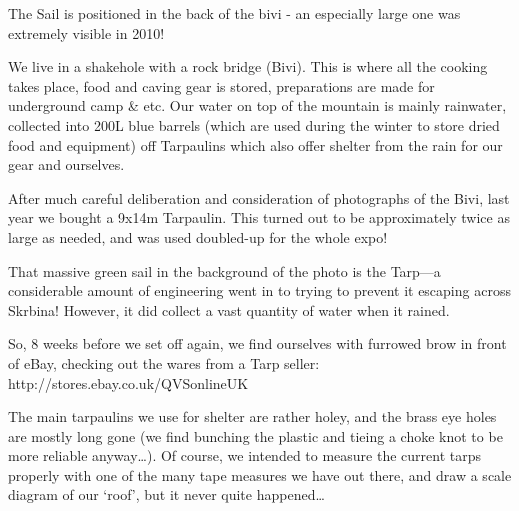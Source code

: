 \begin{pagefigure}
      \checkoddpage \ifoddpage \forcerectofloat \else \forceversofloat \fi
      \centering
  \caption{The Sail is positioned in the back of the bivi - an especially large one was extremely visible in 2010! } \label{2010 big tarp}
\end{pagefigure}

We live in a shakehole with a rock bridge (Bivi). This is where all
the cooking takes place, food and caving gear is stored, preparations
are made for underground camp \& etc. Our water on top of the mountain
is mainly rainwater, collected into 200L blue barrels (which are used
during the winter to store dried food and equipment) off Tarpaulins
which also offer shelter from the rain for our gear and ourselves.

After much careful deliberation and consideration of photographs of
the Bivi, last year we bought a 9x14m Tarpaulin.
This turned out to be approximately twice as large as needed, and was
used doubled-up for the whole expo!


That massive green sail in the background of the photo is the Tarp—a
considerable amount of engineering went in to trying to prevent it
escaping across Skrbina! However, it did collect a vast quantity of
water when it rained.

So, 8 weeks before we set off again, we find ourselves with furrowed
brow in front of eBay, checking out the wares from a Tarp seller:
http://stores.ebay.co.uk/QVSonlineUK

The main tarpaulins we use for shelter are rather holey, and the brass
eye holes are mostly long gone (we find bunching the plastic and
tieing a choke knot to be more reliable anyway…). Of course, we
intended to measure the current tarps properly with one of the many
tape measures we have out there, and draw a scale diagram of our
‘roof’, but it never quite happened…

